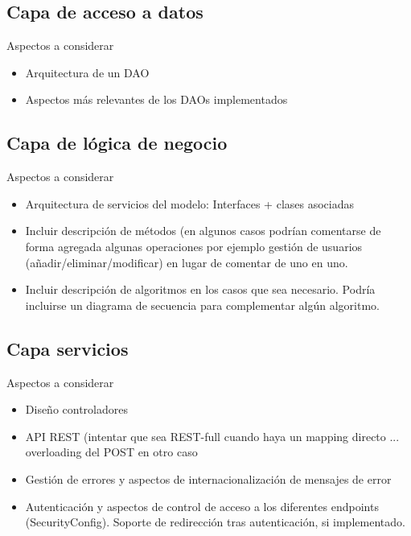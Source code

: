 \subsection{Capa de acceso a datos}

{ \color{red} Aspectos a considerar
    \begin{itemize}
      \item Arquitectura de un DAO
      \item Aspectos más relevantes de los DAOs implementados
    \end{itemize}
}

\subsection{Capa de lógica de negocio}

{ \color{red} Aspectos a considerar
    \begin{itemize}
      \item Arquitectura de servicios del modelo: Interfaces + clases asociadas
      \item Incluir descripción de métodos (en algunos casos podrían comentarse de forma agregada algunas operaciones por ejemplo gestión de usuarios (añadir/eliminar/modificar) en lugar de comentar de uno en uno.
      \item Incluir descripción de algoritmos en los casos que sea necesario. Podría incluirse un diagrama de secuencia para complementar algún algoritmo.
    \end{itemize}
}

\subsection{Capa servicios}

{ \color{red} Aspectos a considerar
    \begin{itemize}
      \item Diseño controladores
      \item API REST (intentar que sea REST-full cuando haya un mapping directo ... overloading del POST en otro caso
      \item Gestión de errores y aspectos de internacionalización de mensajes de error
      \item Autenticación y aspectos de control de acceso a los diferentes endpoints (SecurityConfig). Soporte de redirección tras autenticación, si implementado.
    \end{itemize}
}

